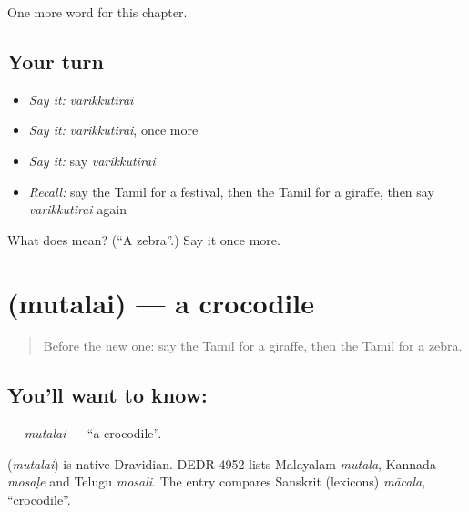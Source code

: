 \begin{grammarlens}[title={What you've built}]
One more word for this chapter.
\end{grammarlens}

\subsection*{Your turn}
\begin{itemize}
\raggedright
  \item \emph{Say it:} \emph{varikkutirai}
  \item \emph{Say it:} \emph{varikkutirai}, once more
  \item \emph{Say it:} say \emph{varikkutirai}
  \item \emph{Recall:} say the Tamil for a festival, then the Tamil for a giraffe, then say \emph{varikkutirai} again
\end{itemize}

\begin{tcolorbox}[breakable,colback=teal!4,colframe=teal!35!black,title={Before you move on}]
What does  mean? (\textquotedblleft{}A zebra\textquotedblright{}.) Say it once more.
\end{tcolorbox}
\section[\texorpdfstring{\ta{முதலை} (mutalai)}{முதலை (mutalai)}]{ (mutalai) — a crocodile}

\label{lesson:TA-C218-mutalai}



\begin{quote}
Before the new one: say the Tamil for a giraffe, then the Tamil for a zebra.
\end{quote}

\subsection*{You'll want to know: }
\textbf{} — \emph{mutalai} — \textquotedblleft{}a crocodile\textquotedblright{}.

\begin{cousinweb}
\textbf{} (\emph{mutalai}) is native Dravidian. DEDR 4952 lists Malayalam \emph{mutala}, Kannada \emph{mosaḷe} and Telugu \emph{mosali}. The entry compares Sanskrit (lexicons) \emph{mācala}, \textquotedblleft{}crocodile\textquotedblright{}.
\end{cousinweb}

